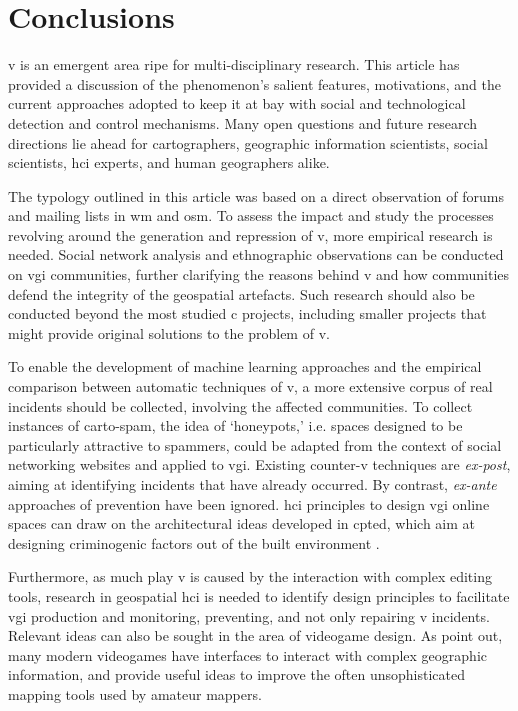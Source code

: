 \documentclass{article} \usepackage{graphicx,xspace}
\begin{document}
\section{Conclusions}  
\label{sec:concl} 


\Gls{v} is an emergent area ripe for multi-disci\-pli\-nary research.
This article has provided a discussion of the phenomenon's salient features, motivations, and the current approaches adopted to keep it at bay with social and technological detection and control mechanisms.
Many open questions and future research directions lie ahead for cartographers, geographic information scientists, social scientists, \gls{hci} experts, and human geographers alike.





  The typology outlined in this article was based on a direct observation of forums and mailing lists in \gls{wm} and \gls{osm}.
  To assess the impact and study the processes revolving around the generation and repression of \gls{v}, more empirical research is needed. Social network analysis and ethnographic observations can be conducted on \gls{vgi} communities, further clarifying the reasons behind \gls{v} and how communities defend the integrity of the geospatial artefacts. Such research should also be conducted beyond the most studied \gls{c} projects, including smaller projects that might provide original solutions to the problem of \gls{v}.

To enable the development of machine learning approaches and the empirical comparison between automatic techniques of \gls{v}, a more extensive corpus of real incidents should be collected, involving the affected communities. To collect instances of carto-spam, the idea of `honeypots,' i.e. spaces designed to be particularly attractive to spammers, could be adapted from the context of social networking websites and applied to \gls{vgi}. Existing counter-\gls{v} techniques are \emph{ex-post}, aiming at identifying incidents that have already occurred.
  By contrast, \emph{ex-ante} approaches of prevention have been ignored.
  \Gls{hci} principles to design \gls{vgi} online spaces can draw on the architectural ideas developed in \gls{cpted}, which aim at designing criminogenic factors out of the built environment \citep{cozens:2008:histcpted}.
  
  Furthermore, as much play \gls{v} is caused by the interaction with complex editing tools, research in geospatial \gls{hci} is needed to identify design principles to facilitate \gls{vgi} production and monitoring, preventing, and not only repairing \gls{v} incidents.
  Relevant ideas can also be sought in the area of videogame design.
  As \cite{shepherd:2009:videogamesgis} point out, many modern videogames have interfaces to interact with complex geographic information, and provide useful ideas to improve the often unsophisticated mapping tools used by amateur mappers.
\end{document}
